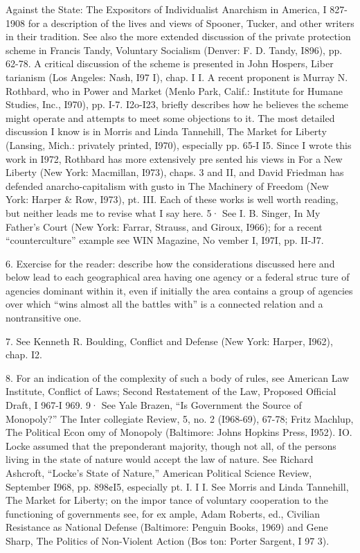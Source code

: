 \documentclass[11pt,openany]{book}
\begin{document}
{Against the State: The Expositors of Individualist Anarchism in America, I 827-1908 for a description of the lives and views of Spooner, Tucker, and other writers in their tradition. See also the more extended discussion of the private protection scheme in Francis Tandy, Voluntary Socialism (Denver: F. D. Tandy, I896), pp. 62-78. A critical discussion of the scheme is presented in John Hospers, Liber tarianism (Los Angeles: Nash, I97 I), chap. I I. A recent proponent is Murray N. Rothbard, who in Power and Market (Menlo Park, Calif.: Institute for Humane Studies, Inc., I970), pp. I-7. I2o-I23, briefly describes how he believes the scheme might operate and attempts to meet some objections to it. The most detailed discussion I know is in Morris and Linda Tannehill, The Market for Liberty (Lansing, Mich.: privately printed, I970), especially pp. 65-I I5. Since I wrote this work in I972, Rothbard has more extensively pre sented his views in For a New Liberty (New York: Macmillan, I973), chaps. 3 and II, and David Friedman has defended anarcho-capitalism with gusto in The Machinery of Freedom (New York: Harper \& Row, I973), pt. III. Each of these works is well worth reading, but neither leads me to revise what I say here. 5· See I. B. Singer, In My Father's Court (New York: Farrar, Strauss, and Giroux, I966); for a recent ``counterculture'' example see WIN Magazine, No vember I, I97I, pp. II-J7.\par

6. Exercise for the reader: describe how the considerations discussed here and below lead to each geographical area having one agency or a federal struc ture of agencies dominant within it, even if initially the area contains a group of agencies over which ``wins almost all the battles with'' is a connected relation and a nontransitive one.\par

7. See Kenneth R. Boulding, Conflict and Defense (New York: Harper, I962), chap. I2.\par

8. For an indication of the complexity of such a body of rules, see American Law Institute, Conflict of Laws; Second Restatement of the Law, Proposed Official Draft, I 967-I 969. 9· See Yale Brazen, ``Is Government the Source of Monopoly?'' The Inter collegiate Review, 5, no. 2 (I968-69), 67-78; Fritz Machlup, The Political Econ omy of Monopoly (Baltimore: Johns Hopkins Press, I952). IO. Locke assumed that the preponderant majority, though not all, of the persons living in the state of nature would accept the law of nature. See Richard Ashcroft, ``Locke's State of Nature,'' American Political Science Review, September I968, pp. 898¢I5, especially pt. I. I I. See Morris and Linda Tannehill, The Market for Liberty; on the impor tance of voluntary cooperation to the functioning of governments see, for ex ample, Adam Roberts, ed., Civilian Resistance as National Defense (Baltimore: Penguin Books, 1969) and Gene Sharp, The Politics of Non-Violent Action (Bos ton: Porter Sargent, I 97 3).\par

}
\end{document}
